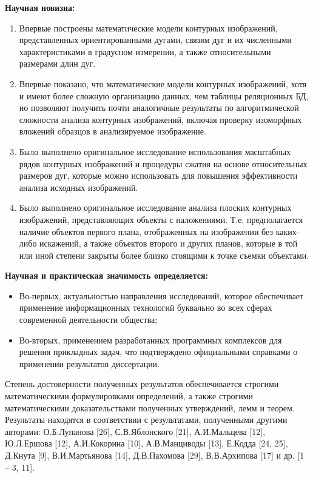 \textbf{Научная новизна:}
\begin{enumerate}
\item Впервые построены математические модели контурных изображений, представленных ориентированными дугами, связям дуг и их численными характеристиками в градусном измерении,  а также  относительными размерами  длин дуг.  
\item Впервые  показано, что математические модели контурных изображений, хотя и имеют более сложную организацию данных, чем  таблицы реляционных БД, но позволяют получить почти аналогичные результаты по алгоритмической сложности  анализа контурных изображений, включая проверку изоморфных вложений образцов в анализируемое изображение.
\item Было выполнено оригинальное исследование использования масштабных рядов контурных изображений и процедуры сжатия на  основе относительных размеров дуг, которые можно использовать для повышения эффективности анализа исходных изображений.
\item Было выполнено оригинальное исследование анализа плоских контурных изображений, представляющих объекты с наложениями. Т.е. предполагается наличие объектов первого плана, отображенных на изображении без каких-либо искажений,  а также объектов второго и других планов, которые в той или иной степени закрыты более близко стоящими к точке съемки объектами.
\end{enumerate}

\noindent
\textbf{Научная и практическая значимость определяется:}
\begin{itemize}
\item Во-первых, актуальностью направления исследований, которое обеспечивает применение информационных технологий буквально во всех сферах современной деятельности общества;
\item Во-вторых, применением разработанных программных комплексов для решения прикладных задач, что подтверждено официальными справками о применении результатов диссертации.
\end{itemize}

Степень достоверности полученных результатов обеспечивается строгими математическими формулировками определений, а также строгими математическими доказательствами полученных утверждений, лемм и теорем.
Результаты находятся в соответствии с результатами, полученными другими авторами:  О.Б.Лупанова [26],  С.В.Яблонского [21], А.И.Мальцева [12],  Ю.Л.Ершова [12],  А.И.Кокорина [10], А.В.Манциводы [13],  Е.Кодда [24, 25], Д.Кнута [9], В.И.Мартьянова [14], Д.В.Пахомова [29], В.В.Архипова [17] и др. [1 – 3, 11].

